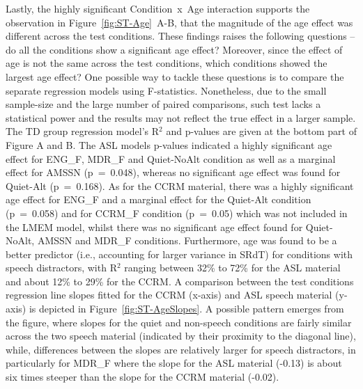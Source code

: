 \documentclass[a4paper, twoside]{templates/ociamthesis}
\begin{document}
Lastly, the highly significant Condition~x~Age interaction supports the observation in Figure~\ref{fig:ST-Age}~A-B, that the magnitude of the age effect was different across the test conditions. These findings raises the following questions -- do all the conditions show a significant age effect? Moreover, since the effect of age is not the same across the test conditions, which conditions showed the largest age effect? One possible way to tackle these questions is to compare the separate regression models using F-statistics. Nonetheless, due to the small sample-size and the large number of paired comparisons, such test lacks a statistical power and the results may not reflect the true effect in a larger sample. The TD group regression model's R\(^{2}\) and p-values are given at the bottom part of Figure A and B. The ASL models p-values indicated a highly significant age effect for ENG\_F, MDR\_F and Quiet-NoAlt condition as well as a marginal effect for AMSSN (p~=~0.048), whereas no significant age effect was found for Quiet-Alt (p~=~0.168). As for the CCRM material, there was a highly significant age effect for ENG\_F and a marginal effect for the Quiet-Alt condition (p~=~0.058) and for CCRM\_F condition (p~=~0.05) which was not included in the LMEM model, whilst there was no significant age effect found for Quiet-NoAlt, AMSSN and MDR\_F conditions. Furthermore, age was found to be a better predictor (i.e., accounting for larger variance in SRdT) for conditions with speech distractors, with R\(^{2}\) ranging between 32\% to 72\% for the ASL material and about 12\% to 29\% for the CCRM. A comparison between the test conditions regression line slopes fitted for the CCRM (x-axis) and ASL speech material (y-axis) is depicted in Figure~\ref{fig:ST-AgeSlopes}. A possible pattern emerges from the figure, where slopes for the quiet and non-speech conditions are fairly similar across the two speech material (indicated by their proximity to the diagonal line), while, differences between the slopes are relatively larger for speech distractors, in particularly for MDR\_F where the slope for the ASL material (-0.13) is about six times steeper than the slope for the CCRM material (-0.02).
\end{document}
